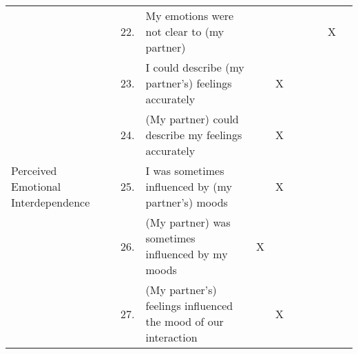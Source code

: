 \begin{table}[h]
\begin{tabular}{@{}lcl|ccccccc@{}}
                                     & 22.      & My emotions were not clear to (my partner)                                 &                                                              &          &                                                              &         &                                                           & X     &                                                           \\
                                     & 23.      & I could describe (my partner's) feelings accurately                        &                                                              & X        &                                                              &         &                                                           &       &                                                           \\
                                     & 24.      & (My partner) could describe my feelings accurately                         &                                                              & X        &                                                              &         &                                                           &       &                                                           \\ \midrule
Perceived Emotional Interdependence  & 25.      & I was sometimes influenced by (my partner's) moods                         &                                                              & X        &                                                              &         &                                                           &       &                                                           \\
                                     & 26.      & (My partner) was sometimes influenced by my moods                          & X                                                            &          &                                                              &         &                                                           &       &                                                           \\
                                     & 27.      & (My partner's) feelings influenced the mood of our interaction             &                                                              & X        &                                                              &         &                                                           &       &                                                           \\

\end{tabular}
\end{table}
